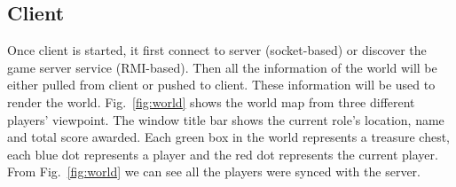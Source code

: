 \documentclass[11pt, oneside]{article}   	%
\begin{document}
\subsection{Client}
Once client is started, it first connect to server (socket-based) or discover the game server service (RMI-based). Then all the information of the world will be either pulled from client or pushed to client. These information will be used to render the world.
Fig.~\ref{fig:world} shows the world map from three different players' viewpoint.
The window title bar shows the current role's location, name and total score awarded.
Each green box in the world represents a treasure chest, each blue dot represents a player and the red dot represents the current player.
From Fig.~\ref{fig:world} we can see all the players were synced with the server.
\begin{figure}[htbp] %
   \centering

\end{figure}
\end{document}
